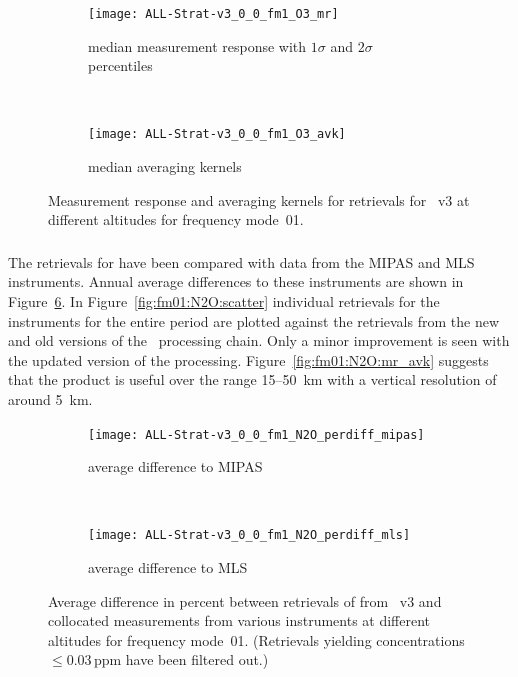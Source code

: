 \begin{figure}[tbhp]
    \centering
    \begin{subfigure}[b]{0.49\textwidth}
        \texttt{[image: ALL-Strat-v3\_0\_0\_fm1\_O3\_mr]}
        \caption{median measurement response with $1\sigma$ and $2\sigma$
        percentiles}
        \label{fig:fm01:O3:mr}
    \end{subfigure}
    \,
    \begin{subfigure}[b]{0.49\textwidth}
        \texttt{[image: ALL-Strat-v3\_0\_0\_fm1\_O3\_avk]}
        \caption{median averaging kernels\newline~}
        \label{fig:fm01:O3:avk}
    \end{subfigure}
    \caption{Measurement response and averaging kernels for 
    retrievals for \smr~v3 at different altitudes for frequency mode~01.}
    \label{fig:fm01:O3:mr_avk}
\end{figure}


\newpage
\subsubsection{}
\label{sec:fm01:comparison:N2O}
The retrievals for  have been compared with data from the MIPAS and
MLS instruments. Annual average differences to these instruments are shown in
Figure~\ref{fig:fm01:N2O:profiles}. In Figure~\ref{fig:fm01:N2O:scatter}
individual retrievals for the instruments for the entire period are plotted
against the retrievals from the new and old versions of the \smr\ processing
chain. Only a minor improvement is seen with the updated version of the
processing. Figure~\ref{fig:fm01:N2O:mr_avk} suggests that the product is
useful over the range 15--50~km with a vertical resolution of around 5~km.


\begin{figure}[tbhp]
    \centering
    \begin{subfigure}[b]{0.49\textwidth}
        \texttt{[image: ALL-Strat-v3\_0\_0\_fm1\_N2O\_perdiff\_mipas]}
        \caption{average difference to MIPAS}
        \label{fig:fm01:N2O:profiles:MIPAS}
    \end{subfigure}
    \,
    \begin{subfigure}[b]{0.49\textwidth}
        \texttt{[image: ALL-Strat-v3\_0\_0\_fm1\_N2O\_perdiff\_mls]}
        \caption{average difference to MLS}
        \label{fig:fm01:N2O:profiles:MLS}
    \end{subfigure}
    \caption{Average difference in percent between retrievals of 
    from \smr~v3 and collocated measurements from various instruments at
    different altitudes for frequency mode~01. (Retrievals yielding
    concentrations $\leq 0.03\,\mathrm{ppm}$ have been filtered out.)}
    \label{fig:fm01:N2O:profiles}
\end{figure}

